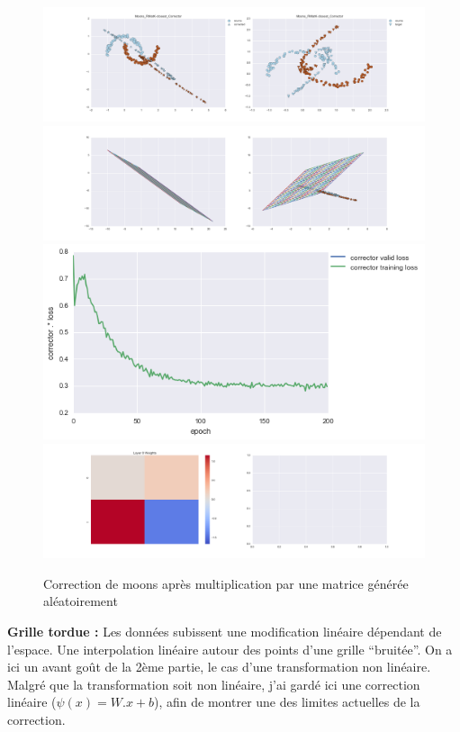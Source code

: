 \begin{figure}[H] %
\centering
\includegraphics[width=\linewidth]{fig/24-05-2016/moons/Moons_RMatK-closest_Corrector-DATA.png}
\includegraphics[width=\linewidth]{fig/24-05-2016/moons/Moons_RMatK-closest_Corrector-GridCheck.png}
\includegraphics[width=0.45\linewidth]{fig/24-05-2016/moons/Moons_RMatK-closest_Corrector-Learning_curve.png}
\includegraphics[width=\linewidth]{fig/24-05-2016/moons/Moons_RMatK-closest_Corrector-W.png}
\caption{Correction de moons après multiplication par une matrice générée aléatoirement}
\label{fig:recap-moons-RMat-exhaustive}
\end{figure}

{\Large \textbf{Grille tordue :}} Les données subissent une modification linéaire dépendant de l'espace.
Une interpolation linéaire autour des points d'une grille ``bruitée''.
On a ici un avant goût de la 2ème partie, le cas d'une transformation non linéaire.
Malgré que la transformation soit non linéaire, j'ai gardé ici une correction linéaire ($\psi(x) = W.x+b$),
afin de montrer une des limites actuelles de la correction.

